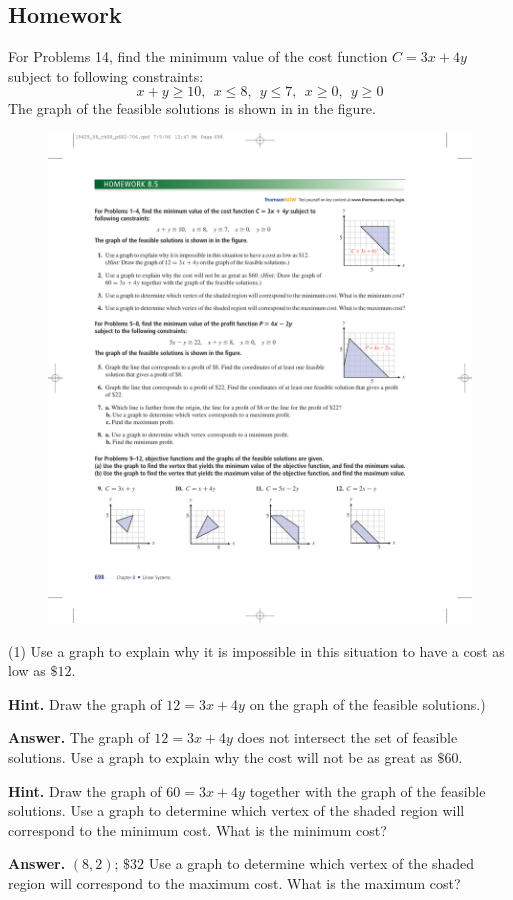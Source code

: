 \documentclass[10pt,]{book}
\theoremstyle{plain}
\theoremstyle{definition}
\theoremstyle{definition}
\theoremstyle{definition}
\numberwithin{equation}{part}
\begin{document}
\subsection[{Homework}]{Homework}\label{section-8-5-exercises}
\hypertarget{exercisegroup-1}{}\par\noindent For Problems 1\textendash{}4, find the minimum value of the cost function \(C = 3x+ 4y\) subject to following constraints:%
\begin{equation*}
x + y \ge 10, ~~x \le 8, ~~y \le 7, ~~x \ge 0, ~~y \ge 0
\end{equation*}
The graph of the feasible solutions is shown in in the figure. \leavevmode%
\begin{figure}
\centering
\includegraphics[width=0.35\linewidth]{images/fig-8-5-1}
\end{figure}
%
\begin{exercisegroup}(1)
\exercise[1.]\hypertarget{exercise-5}{}Use a graph to explain why it is impossible in this situation to have a cost as low as \(\$12\).%
\par\smallskip
\noindent\textbf{Hint.}\hypertarget{hint-1}{}\quad
Draw the graph of \(12 = 3x + 4y\) on the graph of the feasible solutions.)%
\par\smallskip
\noindent\textbf{Answer.}\hypertarget{answer-5}{}\quad
The graph of \(12 = 3x + 4y\) does not intersect the set of feasible solutions.%
\exercise[2.]\hypertarget{exercise-6}{}Use a graph to explain why the cost will not be as great as \(\$60\).%
\par\smallskip
\noindent\textbf{Hint.}\hypertarget{hint-2}{}\quad
Draw the graph of \(60 = 3x + 4y\) together with the graph of the feasible solutions.%
\exercise[3.]\hypertarget{exercise-7}{}Use a graph to determine which vertex of the shaded region will correspond to the minimum cost. What is the minimum cost?%
\par\smallskip
\noindent\textbf{Answer.}\hypertarget{answer-6}{}\quad
\((8, 2)\); \(\$32\)%
\exercise[4.]\hypertarget{exercise-8}{}Use a graph to determine which vertex of the shaded region will correspond to the maximum cost. What is the maximum cost?%
\end{exercisegroup}
\end{document}
